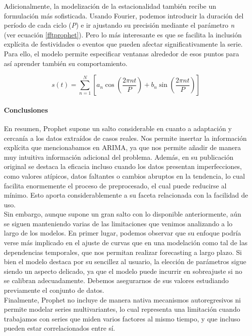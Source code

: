 Adicionalmente, la modelización de la estacionalidad también recibe un formulación más sofisticada. Usando Fourier, podemos introducir la duración del período de cada ciclo (\textit{P}) e ir ajustando su precisión mediante el parámetro \textit{n} (ver ecuación \ref{fftprophet}). Pero lo más interesante es que se facilita la inclusión explícita de festividades o eventos que pueden afectar significativamente la serie. Para ello, el modelo permite especificar ventanas alrededor de esos puntos para así aprender también su comportamiento.

\begin{equation}
	s(t) = \sum_{n=1}^{N} \left[ a_n \cos\left( \frac{2\pi n t}{P} \right) + b_n \sin\left( \frac{2\pi n t}{P} \right) \right]
	\label{fftprophet}
\end{equation}

\paragraph{Conclusiones}

En resumen, Prophet supone un salto considerable en cuanto a adaptación y cercanía a los datos extraídos de casos reales. Nos permite insertar la información explícita que mencionabamos en ARIMA, ya que nos permite añadir de manera muy intuitiva información adicional del problema. Además, en su publicación original se destaca la eficacia incluso cuando los datos presentan imperfecciones, como valores atípicos, datos faltantes o cambios abruptos en la tendencia, lo cual facilita enormemente el proceso de preprocesado, el cual puede reducirse al mínimo. Esto aporta considerablemente a su faceta relacionada con la facilidad de uso.\\

Sin embargo, aunque supone un gran salto con lo disponible anteriormente, aún se siguen manteniendo varias de las limitaciones que venimos analizando a lo largo de los modelos. En primer lugar, podemos observar que su enfoque podría verse más implicado en el ajuste de curvas que en una modelación como tal de las dependencias temporales, que nos permitan realizar forecasting a largo plazo. Si bien el modelo destaca por su sencillez al usuario, la elección de parámetros sigue siendo un aspecto delicado, ya que el modelo puede incurrir en sobreajuste si no se calibran adecuadamente. Debemos asegurarnos de sus valores estudiando previamente el conjunto de datos.\\

 Finalmente, Prophet no incluye de manera nativa mecanismos autoregresivos ni permite modelar series multivariantes, lo cual representa una limitación cuando trabajamos con series que miden varios factores al mismo tiempo, y que incluso pueden estar correlacionados entre sí.

